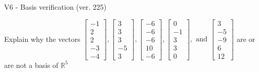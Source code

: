 \begin{exercise}
  \begin{exerciseTitle}V6 - Basis verification (ver. 225)\end{exerciseTitle}
  \begin{exerciseStatement}
    Explain why the vectors \(\left[\begin{array}{r}
-1 \\
2 \\
2 \\
-3 \\
-4
\end{array}\right] , \left[\begin{array}{r}
3 \\
3 \\
3 \\
-5 \\
3
\end{array}\right] , \left[\begin{array}{r}
-6 \\
-6 \\
-6 \\
10 \\
-6
\end{array}\right] , \left[\begin{array}{r}
0 \\
-1 \\
3 \\
3 \\
0
\end{array}\right] , \text{ and } \left[\begin{array}{r}
3 \\
-5 \\
-9 \\
6 \\
12
\end{array}\right]\) are or are not a basis of \(\mathbb{R}^5\)	



\end{exerciseStatement}
\end{exercise}
